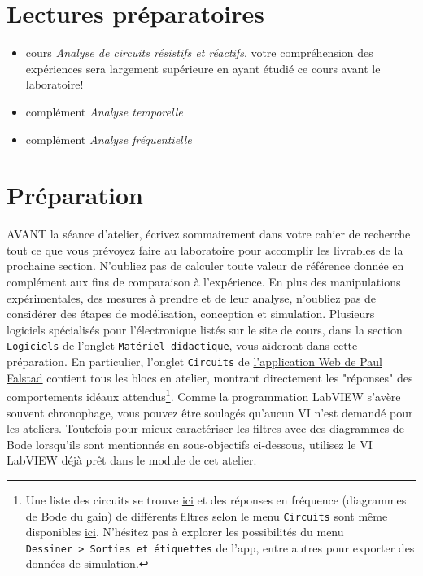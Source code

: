 \documentclass[canadien,12pt,oneside,letterpaper]{article}
\begin{document}
\vspace{-2ex}
\section{Lectures préparatoires}\label{sec:lectures}

\begin{itemize}
\item cours \textit{Analyse de circuits résistifs et réactifs}, votre compréhension des expériences sera largement supérieure en ayant étudié ce cours avant le laboratoire!
\item complément \textit{Analyse temporelle}
\item complément \textit{Analyse fréquentielle}
\end{itemize}


\vspace{-2ex}
\section{Préparation}\label{sec:prep}
\vspace{-3ex}
AVANT la séance d'atelier, écrivez sommairement dans votre cahier de recherche tout ce que vous prévoyez faire au laboratoire pour accomplir les livrables de la prochaine section. N'oubliez pas de calculer toute valeur de référence donnée en complément aux fins de comparaison à l'expérience. En plus des manipulations expérimentales, des mesures à prendre et de leur analyse, n'oubliez pas de considérer des étapes de modélisation, conception et simulation. Plusieurs logiciels spécialisés pour l'électronique listés sur le site de cours, dans la section \texttt{Logiciels} de l'onglet \texttt{Matériel didactique}, vous aideront dans cette préparation. En particulier, l'onglet \texttt{Circuits} de \href{https://www.falstad.com/circuit/}{l'application Web de Paul Falstad} contient tous les blocs en atelier, montrant directement les "réponses" des comportements idéaux attendus\footnote{Une liste des circuits se trouve \href{https://www.falstad.com/circuit/directions.html}{ici} et des réponses en fréquence (diagrammes de Bode du gain) de différents filtres selon le menu \texttt{Circuits} sont même disponibles \href{https://www.falstad.com/afilter/}{ici}. N'hésitez pas à explorer les possibilités du menu \texttt{Dessiner~>~Sorties et étiquettes} de l'app, entre autres pour exporter des données de simulation.}. Comme la programmation LabVIEW s'avère souvent chronophage, vous pouvez être soulagés qu'aucun VI n'est demandé pour les ateliers. Toutefois pour mieux caractériser les filtres avec des diagrammes de Bode lorsqu'ils sont mentionnés en sous-objectifs ci-dessous, utilisez le VI LabVIEW déjà prêt dans le module de cet atelier.
\end{document}
